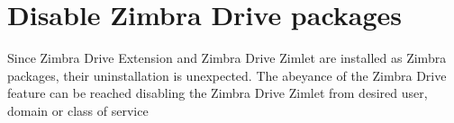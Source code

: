 \section{Disable Zimbra Drive packages}\label{sec:disablePackages}

Since Zimbra Drive Extension and Zimbra Drive Zimlet are installed as Zimbra packages,
their uninstallation is unexpected. The abeyance of the Zimbra Drive feature
can be reached disabling the Zimbra Drive Zimlet from desired user, domain or class of service
